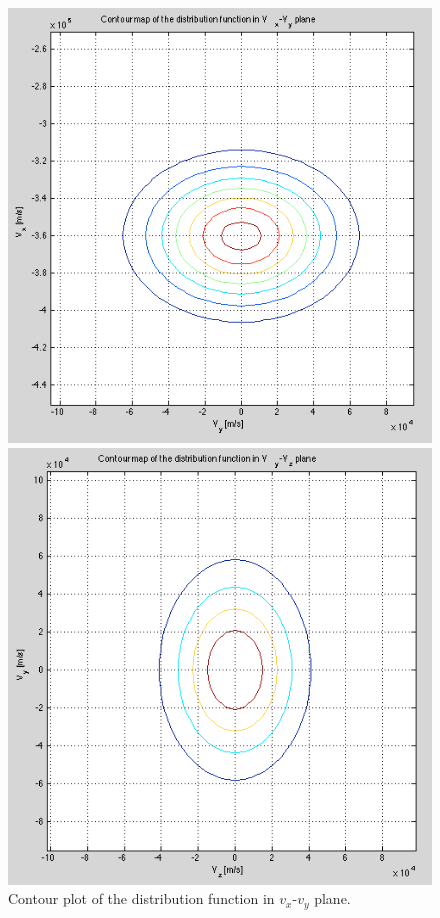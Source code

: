 \documentclass{article}
\begin{document}
\begin{figure}[h!tb]
\begin{minipage}[b]{0.33\linewidth}
\centering
\includegraphics[width=\textwidth]{Figures/plot_10d.png}
\caption{Contour plot of the distribution function in $v_x$-$v_y$ plane.}
\label{fig:plot10d}
\end{minipage}
\begin{minipage}[b]{0.33\linewidth}
\centering
\includegraphics[width=\textwidth]{Figures/plot_10e1.png}

\end{minipage}
\end{figure}
\end{document}

